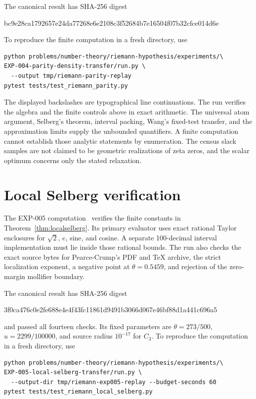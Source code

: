 \documentclass[11pt]{article}
\theoremstyle{remark}
\begin{document}
The canonical result has SHA-256 digest
\begin{center}\small\ttfamily
bc9e28ca1792657e24da77268e6e2108c3f52684b7e16504f07b32cfce014d6e
\end{center}
To reproduce the finite computation in a fresh directory, use
\begin{verbatim}
python problems/number-theory/riemann-hypothesis/experiments/\
EXP-004-parity-density-transfer/run.py \
  --output tmp/riemann-parity-replay
pytest tests/test_riemann_parity.py
\end{verbatim}
The displayed backslashes are typographical line continuations. The run
verifies the algebra and the finite controls above in exact arithmetic. The
universal atom argument, Selberg's theorem, interval packing, Wang's
fixed-test transfer, and the approximation limits supply the unbounded
quantifiers. A finite computation cannot establish those analytic
statements by enumeration.
The census slack samples are not claimed to be geometric realizations of
zeta zeros, and the scalar optimum concerns only the stated relaxation.

\section{Local Selberg verification}

The EXP-005 computation~\cite{RecordV} verifies the finite constants in
Theorem~\ref{thm:localselberg}. Its primary evaluator uses exact rational
Taylor enclosures for $\sqrt2$, $e$, sine, and cosine. A separate
100-decimal interval implementation must lie inside those rational bounds.
The run also checks the exact source bytes for Pearce-Crump's PDF and TeX
archive, the strict localization exponent, a negative point at
$\theta=0.5459$, and rejection of the zero-margin mollifier boundary.

The canonical result has SHA-256 digest
\begin{center}\small\ttfamily
3f0ca476c0e2fe688e4e4f43fc11861d9491b3066d067e46bf88d1a441c696a5
\end{center}
and passed all fourteen checks. Its fixed parameters are
$\theta=273/500$, $u=2299/100000$, and source radius $10^{-17}$ for
$C_3$. To reproduce the computation in a fresh directory, use
\begin{verbatim}
python problems/number-theory/riemann-hypothesis/experiments/\
EXP-005-local-selberg-transfer/run.py \
  --output-dir tmp/riemann-exp005-replay --budget-seconds 60
pytest tests/test_riemann_local_selberg.py
\end{verbatim}
\end{document}

